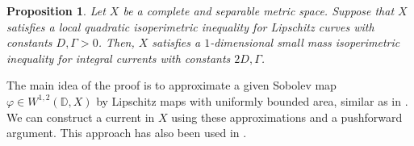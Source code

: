 \documentclass{amsart}
\newtheorem{proposition}[theorem]{Proposition}
\numberwithin{equation}{section}
\begin{document}
        \begin{proposition}\label{prop: sobolev-isop-implies-current-isoper}
            Let $X$ be a complete and separable metric space. Suppose that $X$ satisfies a local quadratic isoperimetric inequality for Lipschitz curves with constants $D,	\Gamma >0$. Then, $X$ satisfies a $1$-dimensional small mass isoperimetric inequality for integral currents with constants $2 D,\Gamma$. 
        \end{proposition}

        
        The main idea of the proof is to approximate a given Sobolev map $\varphi\in W^{1,2}(\mathbb{D},X)$ by Lipschitz maps with uniformly bounded area, similar as in \cite[Proposition 3.1]{Lytchak-wenger-robert}. We can construct a current in $X$ using these approximations and a pushforward argument. This approach has also been used in \cite{basso2023geometric, ikonen2023pushforward, denis-non-orientable}.
\end{document}
